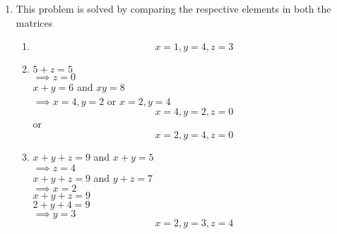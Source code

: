 \renewcommand{\theequation}{\theenumi}
\begin{enumerate}[label=\arabic*.,ref=\thesubsubsection.\theenumi]
%
\item This problem is solved by comparing the respective elements in both the matrices
\begin{enumerate}
\item $$x=1, y=4, z=3$$
\item $5+z = 5$ \\
$\implies z=0$ \\
$x+y=6$ and $xy=8$ \\
$\implies x=4,y=2$ or $x=2,y=4$
$$x=4, y=2, z=0$$ or $$x=2, y=4, z=0$$  
\item $x+y+z=9$ and $x+y=5$ \\
$\implies z=4$\\
$x+y+z=9$ and $y+z=7$\\
$\implies x=2$\\
$x+y+z=9$\\
$2+y+4=9$\\
$\implies y=3$
$$x=2, y=3, z=4$$
\end{enumerate}

\end{enumerate}
